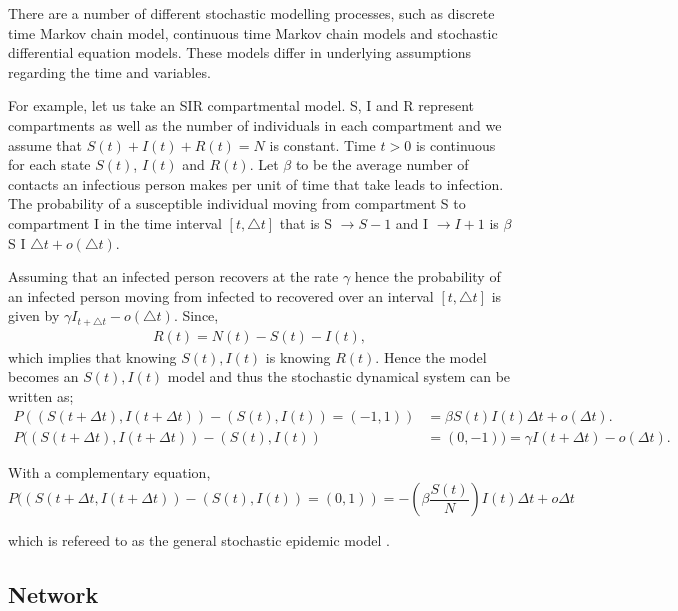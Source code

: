   There are a number of different stochastic modelling processes, such as discrete time Markov chain model, continuous time Markov chain models and stochastic differential equation models. These models differ in underlying assumptions regarding the time and variables.
 
  For example, let us take an SIR compartmental model. S, I and R represent compartments as well as the number of individuals in each compartment and we assume that $S (t) + I (t) + R (t) = N $ is constant. Time $t>0$ is continuous for each state $S (t) $, $I (t) $ and $R (t) $.
  Let $\beta$ to be the average number of contacts an infectious person makes per unit of time that take leads to infection. The probability of a susceptible individual moving from compartment S to compartment I in the time interval $\left[ t,\triangle t \right]$ that is S $\rightarrow S-1$ and I $\rightarrow I + 1 $ is $ \beta$ S I $ \triangle t + o (\triangle t) $.
  
  Assuming that an infected person recovers at the rate $\gamma$ hence the probability of an infected person moving from infected to recovered over an interval $\left[ t,\triangle t \right]$  is given by $\gamma I_ {t + \triangle t} -o (\triangle t) $. Since,
 \begin{align*}
  R(t) = N(t) - S(t) - I(t),
\end{align*}  
which implies that knowing $S(t),I(t)$ is knowing $R(t)$. Hence the model becomes an $S(t),I(t)$ model and thus the stochastic dynamical system can be written as;
 \begin{align}
 P((S(t + \Delta t), I(t + \Delta t)) - (S(t) ,I(t)) = (-1,1)) &=  \beta S(t) I(t)  \Delta t + o (\Delta t).
 \\ P ((S(t + \Delta t), I(t + \Delta t)) - (S(t) ,I(t)) &= ( 0,-1)) = \gamma I(t + \Delta t) -o (\Delta t).
 \end{align} 
 
With a complementary equation,
\begin{equation}
P(( S(t + \Delta t, I(t+ \Delta t)) - (S(t), I(t)) =(0,1)) =  -\left( \beta \dfrac{ S(t)}{N}\right) I(t) \Delta t + o\Delta t
\end{equation}

which is refereed to as the general stochastic  epidemic model \citep{greenwood2009stochastic}.


\subsection{Network}



